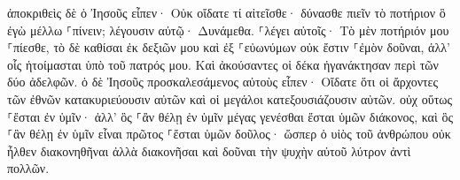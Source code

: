 \documentclass{openreader}
\begin{document}
ἀποκριθεὶς δὲ ὁ Ἰησοῦς εἶπεν· Οὐκ οἴδατε τί αἰτεῖσθε· δύνασθε πιεῖν τὸ ποτήριον ὃ ἐγὼ μέλλω ⸀πίνειν; λέγουσιν αὐτῷ· Δυνάμεθα. 
⸀λέγει αὐτοῖς· Τὸ μὲν ποτήριόν μου ⸀πίεσθε, τὸ δὲ καθίσαι ἐκ δεξιῶν μου καὶ ἐξ ⸀εὐωνύμων οὐκ ἔστιν ⸀ἐμὸν δοῦναι, ἀλλ’ οἷς ἡτοίμασται ὑπὸ τοῦ πατρός μου. 
Καὶ ἀκούσαντες οἱ δέκα ἠγανάκτησαν περὶ τῶν δύο ἀδελφῶν. 
ὁ δὲ Ἰησοῦς προσκαλεσάμενος αὐτοὺς εἶπεν· Οἴδατε ὅτι οἱ ἄρχοντες τῶν ἐθνῶν κατακυριεύουσιν αὐτῶν καὶ οἱ μεγάλοι κατεξουσιάζουσιν αὐτῶν. 
οὐχ οὕτως ⸀ἔσται ἐν ὑμῖν· ἀλλ’ ὃς ⸀ἂν θέλῃ ἐν ὑμῖν μέγας γενέσθαι ἔσται ὑμῶν διάκονος, 
καὶ ὃς ⸀ἂν θέλῃ ἐν ὑμῖν εἶναι πρῶτος ⸀ἔσται ὑμῶν δοῦλος· 
ὥσπερ ὁ υἱὸς τοῦ ἀνθρώπου οὐκ ἦλθεν διακονηθῆναι ἀλλὰ διακονῆσαι καὶ δοῦναι τὴν ψυχὴν αὐτοῦ λύτρον ἀντὶ πολλῶν. 
\end{document}
